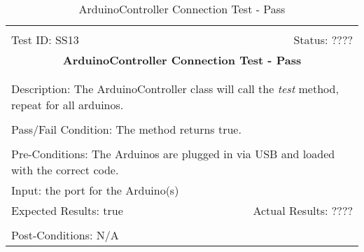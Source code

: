 \documentclass[11pt]{article}
\begin{document}
\begin{center}
\begin{table}[H]
\begin{tabular}{|l r|}\hline&\\[-2mm]
	Test ID: SS13	&Status: ????\\[-3mm]
	\multicolumn{2}{|c|}{\textbf{\large{ArduinoController Connection Test - Pass}}}\\&\\\hline&\\[-3mm]
	\multicolumn{2}{|p{\textwidth}|}{Description: The ArduinoController class will call the \textit{test} method, repeat for all arduinos.}\\[1mm]\hline&\\[-3mm]
	\multicolumn{2}{|p{\textwidth}|}{Pass/Fail Condition: The method returns true.}\\[1mm]\hline&\\[-3mm]
	\multicolumn{2}{|p{\textwidth}|}{Pre-Conditions: The Arduinos are plugged in via USB and loaded with the correct code.}\\[4mm]
	\multicolumn{2}{|p{\textwidth}|}{Input: the port for the Arduino(s)}\\[2mm]\hline
	\multicolumn{1}{|p{0.49\textwidth}}{Expected Results: true}	&\multicolumn{1}{|p{0.45\textwidth}|}{Actual Results: ????}\\\hline&\\[-3mm]
	\multicolumn{2}{|p{\textwidth}|}{Post-Conditions: N/A}\\\hline
\end{tabular}
\caption{ArduinoController Connection Test - Pass}
\end{table}
\end{center}
\end{document}
